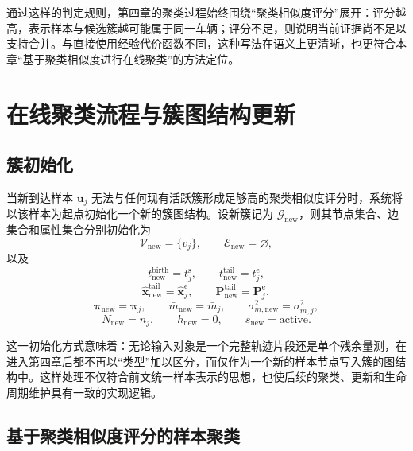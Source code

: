 \documentclass{xdupgthesis}
\begin{document}
通过这样的判定规则，第四章的聚类过程始终围绕“聚类相似度评分”展开：评分越高，表示样本与候选簇越可能属于同一车辆；评分不足，则说明当前证据尚不足以支持合并。与直接使用经验代价函数不同，这种写法在语义上更清晰，也更符合本章“基于聚类相似度进行在线聚类”的方法定位。

\section{在线聚类流程与簇图结构更新}

\subsection{簇初始化}

当新到达样本 $\mathbf{u}_j$ 无法与任何现有活跃簇形成足够高的聚类相似度评分时，系统将以该样本为起点初始化一个新的簇图结构。设新簇记为 $\mathcal{G}_{\mathrm{new}}$，则其节点集合、边集合和属性集合分别初始化为
\begin{equation}
	\mathcal{V}_{\mathrm{new}}=\{v_j\}, \qquad
	\mathcal{E}_{\mathrm{new}}=\varnothing,
\end{equation}
以及
\begin{equation}
	t_{\mathrm{new}}^{\mathrm{birth}} = t_j^{\mathrm{s}}, \qquad
	t_{\mathrm{new}}^{\mathrm{tail}} = t_j^{\mathrm{e}},
\end{equation}
\begin{equation}
	\hat{\mathbf{x}}_{\mathrm{new}}^{\mathrm{tail}} = \hat{\mathbf{x}}_j^{\mathrm{e}}, \qquad
	\mathbf{P}_{\mathrm{new}}^{\mathrm{tail}} = \mathbf{P}_j^{\mathrm{e}},
\end{equation}
\begin{equation}
	\boldsymbol{\pi}_{\mathrm{new}} = \boldsymbol{\pi}_j, \qquad
	\bar m_{\mathrm{new}} = \bar m_j, \qquad
	\sigma_{m,\mathrm{new}}^{2} = \sigma_{m,j}^{2},
\end{equation}
\begin{equation}
	N_{\mathrm{new}} = n_j, \qquad
	h_{\mathrm{new}} = 0, \qquad
	s_{\mathrm{new}} = \mathrm{active}.
\end{equation}

这一初始化方式意味着：无论输入对象是一个完整轨迹片段还是单个残余量测，在进入第四章后都不再以“类型”加以区分，而仅作为一个新的样本节点写入簇的图结构中。这样处理不仅符合前文统一样本表示的思想，也使后续的聚类、更新和生命周期维护具有一致的实现逻辑。

\subsection{基于聚类相似度评分的样本聚类}
\end{document}
